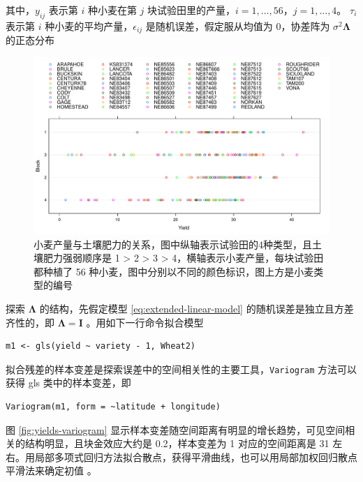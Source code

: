 \documentclass[12pt,a4paper,UTF8,twoside]{book}
\theoremstyle{definition}
\theoremstyle{definition}
\theoremstyle{definition}
\theoremstyle{remark}
\begin{document}
其中，\(y_{ij}\) 表示第 \(i\) 种小麦在第 \(j\)
块试验田里的产量，\(i = 1,\ldots,56\)，\(j = 1,\ldots,4\)。 \(\tau_i\)
表示第 \(i\) 种小麦的平均产量，\(\epsilon_{ij}\)
是随机误差，假定服从均值为 0，协差阵为 \(\sigma^2 \boldsymbol{\Lambda}\)
的正态分布

\begin{figure}

{\centering \includegraphics[width=0.9\linewidth]{figures/Yields-Block} 

}

\caption{小麦产量与土壤肥力的关系，图中纵轴表示试验田的4种类型，且土壤肥力强弱顺序是 1 > 2 > 3 > 4，横轴表示小麦产量，每块试验田都种植了 56 种小麦，图中分别以不同的颜色标识，图上方是小麦类型的编号}\label{fig:yields-block}
\end{figure}

探索 \(\boldsymbol{\Lambda}\) 的结构，先假定模型
\eqref{eq:extended-linear-model} 的随机误差是独立且方差齐性的，即
\(\boldsymbol{\Lambda} = \boldsymbol{I}\) 。用如下一行命令拟合模型

\begin{verbatim}
m1 <- gls(yield ~ variety - 1, Wheat2)
\end{verbatim}

拟合残差的样本变差是探索误差中的空间相关性的主要工具，\texttt{Variogram}
方法可以获得 gls 类中的样本变差，即

\begin{verbatim}
Variogram(m1, form = ~latitude + longitude)
\end{verbatim}

图 \ref{fig:yields-variogram}
显示样本变差随空间距离有明显的增长趋势，可见空间相关的结构明显，且块金效应大约是
0.2，样本变差为 1 对应的空间距离是 31
左右。用局部多项式回归方法拟合散点，获得平滑曲线，也可以用局部加权回归散点平滑法来确定初值
\citep{Xie2008COS}。
\end{document}
